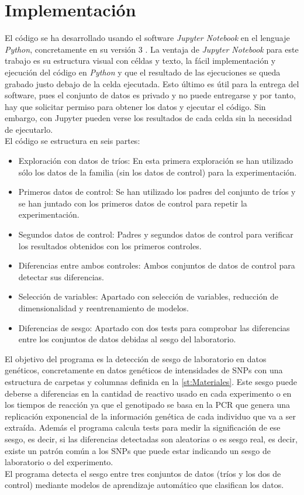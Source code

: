 
\chapter{Implementación}\label{Implementacion}
El código se ha desarrollado usando el software \textit{Jupyter Notebook} en el lenguaje \textit{Python}, concretamente en su versión 3 \cite{10.5555/1593511}. La ventaja de \textit{Jupyter Notebook} para este trabajo es su estructura visual con céldas y texto, la fácil implementación y ejecución del código en \textit{Python} y que el resultado de las ejecuciones se queda grabado justo debajo de la celda ejecutada. Esto último es útil para la entrega del software, pues el conjunto de datos es privado y no puede entregarse y por tanto, hay que solicitar permiso para obtener los datos y ejecutar el código. Sin embargo, con Jupyter pueden verse los resultados de cada celda sin la necesidad de ejecutarlo.\\
El código se estructura en seis partes:
\begin{itemize}
  \item Exploración con datos de tríos: En esta primera exploración se han utilizado sólo los datos de la familia (sin los datos de control) para la experimentación.
  \item Primeros datos de control: Se han utilizado los padres del conjunto de tríos y se han juntado con los primeros datos de control para repetir la experimentación.
  \item Segundos datos de control: Padres y segundos datos de control para verificar los resultados obtenidos con los primeros controles.
  \item Diferencias entre ambos controles: Ambos conjuntos de datos de control para detectar sus diferencias.
  \item Selección de variables: Apartado con selección de variables, reducción de dimensionalidad y reentrenamiento de modelos.
  \item Diferencias de sesgo: Apartado con dos tests para comprobar las diferencias entre los conjuntos de datos debidas al sesgo del laboratorio.
\end{itemize}
El objetivo del programa es la detección de sesgo de laboratorio en datos genéticos, concretamente en datos genéticos de intensidades de SNPs con una estructura de carpetas y columnas definida en la \autoref{st:Materiales}. Este sesgo puede deberse a diferencias en la cantidad de reactivo usado en cada experimento o en los tiempos de reacción ya que el genotipado se basa en la PCR que genera una replicación exponencial de la información genética de cada individuo que va a ser extraída. Además el programa calcula tests para medir la significación de ese sesgo, es decir, si las diferencias detectadas son aleatorias o es sesgo real, es decir, existe un patrón común a los SNPs que puede estar indicando un sesgo de laboratorio o del experimento.\\
El programa detecta el sesgo entre tres conjuntos de datos (tríos y los dos de control) mediante modelos de aprendizaje automático que clasifican los datos.

